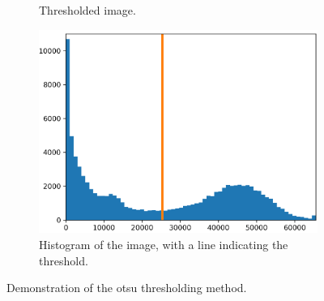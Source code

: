 \documentclass[
  digital,     %
  oneside,     %
  nosansbold,  %
  nocolorbold, %
  lof,         %
  lot,         %
]{fithesis4}
\begin{document}
\begin{figure}
\begin{subfigure}[t]{0.45\textwidth}
        \caption{Thresholded image.}
        \label{fig:otsu-thresholded}
    \end{subfigure}
    \begin{subfigure}[t]{0.6\textwidth}
        \centering
        \includegraphics[width=\textwidth]{resources/otsu-histogram.png}
        \caption{Histogram of the image, with a line indicating the threshold.}
        \label{fig:otsu-histogram}
    \end{subfigure}
    \caption{Demonstration of the otsu thresholding method.}
    \label{fig:opening}
\end{figure}
\end{document}
